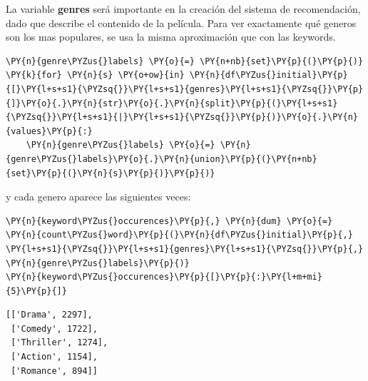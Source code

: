     La variable \textbf{genres} será importante en la creación del sistema
de recomendación, dado que describe el contenido de la película. Para
ver exactamente qué generos son los mas populares, se usa la misma
aproximación que con las keywords.

    \begin{tcolorbox}[breakable, size=fbox, boxrule=1pt, pad at break*=1mm,colback=cellbackground, colframe=cellborder]
\begin{Verbatim}[commandchars=\\\{\}]
\PY{n}{genre\PYZus{}labels} \PY{o}{=} \PY{n+nb}{set}\PY{p}{(}\PY{p}{)}
\PY{k}{for} \PY{n}{s} \PY{o+ow}{in} \PY{n}{df\PYZus{}initial}\PY{p}{[}\PY{l+s+s1}{\PYZsq{}}\PY{l+s+s1}{genres}\PY{l+s+s1}{\PYZsq{}}\PY{p}{]}\PY{o}{.}\PY{n}{str}\PY{o}{.}\PY{n}{split}\PY{p}{(}\PY{l+s+s1}{\PYZsq{}}\PY{l+s+s1}{|}\PY{l+s+s1}{\PYZsq{}}\PY{p}{)}\PY{o}{.}\PY{n}{values}\PY{p}{:}
    \PY{n}{genre\PYZus{}labels} \PY{o}{=} \PY{n}{genre\PYZus{}labels}\PY{o}{.}\PY{n}{union}\PY{p}{(}\PY{n+nb}{set}\PY{p}{(}\PY{n}{s}\PY{p}{)}\PY{p}{)}
\end{Verbatim}
\end{tcolorbox}

    y cada genero aparece las siguientes veces:

    \begin{tcolorbox}[breakable, size=fbox, boxrule=1pt, pad at break*=1mm,colback=cellbackground, colframe=cellborder]
\begin{Verbatim}[commandchars=\\\{\}]
\PY{n}{keyword\PYZus{}occurences}\PY{p}{,} \PY{n}{dum} \PY{o}{=} \PY{n}{count\PYZus{}word}\PY{p}{(}\PY{n}{df\PYZus{}initial}\PY{p}{,} \PY{l+s+s1}{\PYZsq{}}\PY{l+s+s1}{genres}\PY{l+s+s1}{\PYZsq{}}\PY{p}{,} \PY{n}{genre\PYZus{}labels}\PY{p}{)}
\PY{n}{keyword\PYZus{}occurences}\PY{p}{[}\PY{p}{:}\PY{l+m+mi}{5}\PY{p}{]}
\end{Verbatim}
\end{tcolorbox}

            \begin{tcolorbox}[breakable, boxrule=.5pt, size=fbox, pad at break*=1mm, opacityfill=0]
\begin{Verbatim}[commandchars=\\\{\}]
[['Drama', 2297],
 ['Comedy', 1722],
 ['Thriller', 1274],
 ['Action', 1154],
 ['Romance', 894]]
\end{Verbatim}
\end{tcolorbox}
        
